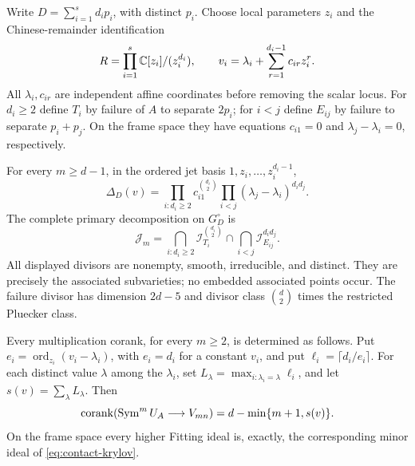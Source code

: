 Write $D=\sum_{i=1}^s d_i p_i$, with distinct $p_i$. Choose local
parameters $z_i$ and the Chinese-remainder identification
\[
 R=\prod_{i=1}^s\mathbb C[z_i]/(z_i^{d_i}),\qquad
 v_i=\lambda_i+\sum_{r=1}^{d_i-1}c_{ir}z_i^r.
\]
All $\lambda_i,c_{ir}$ are independent affine coordinates before
removing the scalar locus. For $d_i\ge2$ define $T_i$ by failure
of $A$ to separate $2p_i$; for $i<j$ define $E_{ij}$ by failure
to separate $p_i+p_j$. On the frame space they have equations
$c_{i1}=0$ and $\lambda_j-\lambda_i=0$, respectively.

\begin{theorem}\label{thm:contact-factorization}
For every $m\ge d-1$, in the ordered jet basis $1,z_i,\ldots,z_i^{d_i-1}$,
\begin{equation}\label{eq:contact-confluent-determinant}
 \Delta_D(v)=
 \prod_{i:d_i\ge2}c_{i1}^{\binom{d_i}{2}}
 \prod_{i<j}(\lambda_j-\lambda_i)^{d_i d_j}.
\end{equation}
The complete primary decomposition on $G_D^\circ$ is
\begin{equation}\label{eq:contact-full-primary}
 \mathcal J_m=
 \bigcap_{i:d_i\ge2}\mathcal I_{T_i}^{\binom{d_i}{2}}
 \cap\bigcap_{i<j}\mathcal I_{E_{ij}}^{d_i d_j}.
\end{equation}
All displayed divisors are nonempty, smooth, irreducible, and
distinct. They are precisely the associated subvarieties; no
embedded associated points occur. The failure divisor has dimension
$2d-5$ and divisor class $\binom d2$ times the restricted Pluecker
class.

Every multiplication corank, for every $m\ge2$, is determined as
follows. Put $e_i=\operatorname{ord}_{z_i}(v_i-\lambda_i)$, with
$e_i=d_i$ for a constant $v_i$, and put $\ell_i=\lceil d_i/e_i\rceil$.
For each distinct value $\lambda$ among the $\lambda_i$, set
$L_\lambda=\max_{i:\lambda_i=\lambda}\ell_i$, and let
$s(v)=\sum_\lambda L_\lambda$. Then
\begin{equation}\label{eq:contact-all-coranks}
 \operatorname{corank}(\operatorname{Sym}^m U_A\longrightarrow V_{mn})
                 =d-\min\{m+1,s(v)\}.
\end{equation}
On the frame space every higher Fitting ideal is, exactly, the
corresponding minor ideal of \eqref{eq:contact-krylov}.
\end{theorem}
